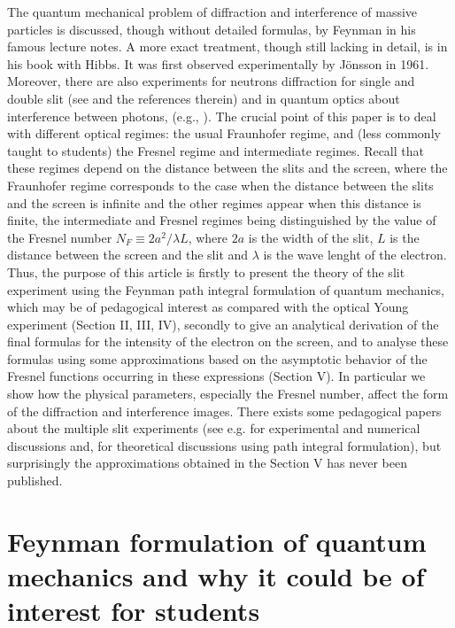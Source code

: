 \documentclass[12pt]{article}   %
\begin{document}
The quantum mechanical problem of diffraction and interference of
massive particles is discussed, though without detailed formulas,
by Feynman in his famous lecture notes.\cite{Feynman} A more
exact treatment, though still lacking in detail, is in his book
with Hibbs.\cite{FH} It was first observed experimentally by
J\"onsson in 1961.\cite{Jonsson} Moreover, there are also
experiments for neutrons diffraction for single and double slit 
(see \cite{Zeilinger} and the references therein)
and in quantum optics about interference between photons,
(e.g., \cite{Mandel}).  
The crucial point of this paper is to deal with different optical regimes: the usual
Fraunhofer regime, and (less commonly taught to students) the
Fresnel regime and intermediate regimes. 
Recall that these regimes depend on the distance between the slits and
the screen, where the Fraunhofer regime corresponds to the case
when the distance between the slits and the screen is infinite and
the other regimes appear when this distance is finite, the
intermediate and Fresnel regimes being distinguished by the value
of the Fresnel number $N_F\equiv 2a^2/\lambda L$, where $2a$ is the
width of the slit, $L$ is the distance between the screen and
the slit and $\lambda$ is the wave lenght of the electron. 
Thus, the purpose of this article is firstly to present the theory of the slit experiment
using the Feynman path integral formulation of quantum mechanics,
which may be of pedagogical interest as compared with the optical
Young experiment (Section II, III, IV), secondly to give an analytical
derivation of the final formulas for the intensity of the electron
on the screen, and to analyse these formulas using some
approximations based on the asymptotic behavior of the Fresnel
functions \cite{Abramowitz} occurring in these expressions (Section V). 
In particular we show how the physical parameters, especially the
Fresnel number, affect the form of the diffraction and
interference images. There exists some pedagogical papers 
about the multiple slit experiments 
(see e.g. \cite{Frabboni} for experimental and numerical discussions
and, \cite{Barut} for theoretical discussions using path integral formulation),
but surprisingly the approximations obtained in the Section V has never been published.




\section{Feynman formulation of quantum mechanics and why it could be of interest for students}
\end{document}
